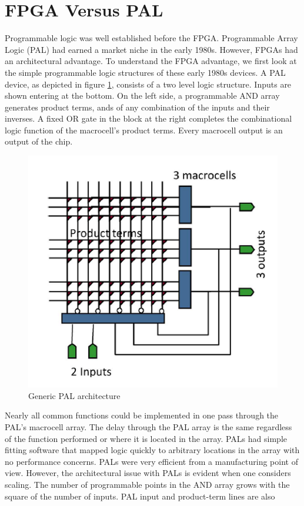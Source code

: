 \section{FPGA Versus PAL}
\noindent Programmable logic was well established before the
FPGA. Programmable Array Logic
(PAL) had earned a market niche in the early 1980s.
However, FPGAs had an architectural advantage. To understand
the FPGA advantage, we first look at the simple
programmable logic structures of these early 1980s devices.
A PAL device, as depicted in figure \ref{fig:pal}, consists of a two level
logic structure. Inputs are shown entering at
the bottom. On the left side, a programmable AND array
generates product terms, ands of any combination of the
inputs and their inverses. A fixed OR gate in the block at
the right completes the combinational logic function of the
macrocell’s product terms. Every macrocell output is an
output of the chip.
\begin{figure}[H]
	\centering
	\includegraphics[width=0.7\linewidth]{IMG/ch3/PAL}
	\caption{Generic PAL architecture}
	\label{fig:pal}
\end{figure}
\noindent Nearly all common functions could be implemented in one pass through the PAL's macrocell array.
The delay through the PAL array is the same regardless of the function performed or where it is located in the array.
PALs had simple fitting software that mapped logic quickly to arbitrary locations in the array with no performance concerns.
PALs were very efficient from a manufacturing point of view.
However, the architectural issue with PALs is evident when one considers scaling. The number of programmable points in
the AND array grows with the square of the number of inputs. PAL input and product-term lines are also
